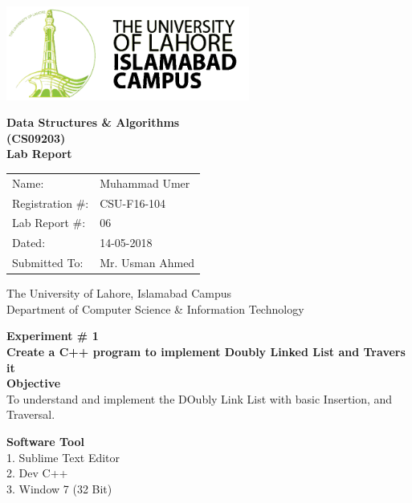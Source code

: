 \documentclass[11pt]{article}            %
\begin{document}
\begin{titlepage}
    \centering
  \vfill
    \includegraphics[width=8cm]{uni_logo.png} \\ 
	\vskip2cm
    {\bfseries\Large
	Data Structures  \& Algorithms \\ (CS09203)\\
	
	\vskip2cm
	Lab Report 
	 
	\vskip2cm
	}    

\begin{center}
\begin{tabular}{ l l  } 

Name: & Muhammad Umer \\ 
Registration \#: & CSU-F16-104 \\ 
Lab Report \#: & 06 \\ 
 Dated:& 14-05-2018\\ 
Submitted To:& Mr. Usman Ahmed\\ 

\end{tabular}
\end{center}
    \vfill
    The University of Lahore, Islamabad Campus\\
Department of Computer Science \& Information Technology
\end{titlepage}


    
    {\bfseries\Large
\centering
	Experiment \# 1 \\

Create a C++ program to implement Doubly Linked List and Travers it\\
	
	}    
 \vskip1cm
 \textbf {Objective}\\  To understand and implement the DOubly Link List with basic Insertion, and Traversal.
 
 \textbf {Software Tool} \\
1. Sublime Text Editor\\
2. Dev C++\\
3. Window 7 (32 Bit)\\
\end{document}
